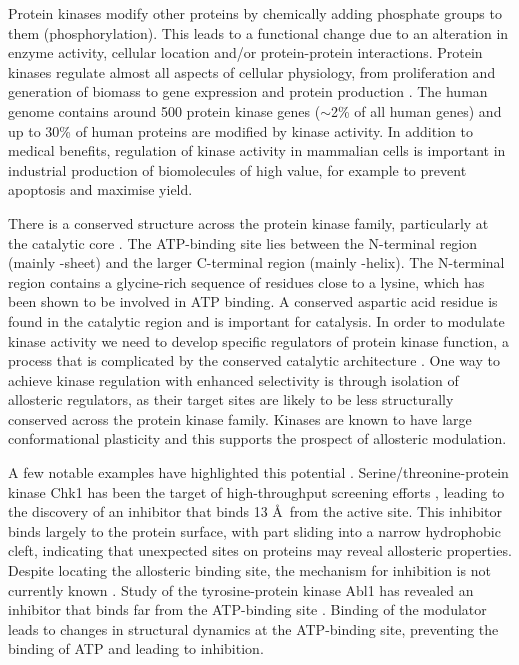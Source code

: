 Protein kinases modify other proteins by chemically adding phosphate groups to them (phosphorylation).
This leads to a functional change due to an alteration in enzyme activity, cellular location and/or protein-protein interactions.
Protein kinases regulate almost all aspects of cellular physiology, from proliferation and generation of biomass to gene expression and protein production \cite{Manning2002}.
The human genome contains around 500 protein kinase genes ($\sim$2\% of all human genes) and up to 30\% of human proteins are modified by kinase activity.
In addition to medical benefits, regulation of kinase activity in mammalian cells is important in industrial production of biomolecules of high value, for example to prevent apoptosis and maximise yield.

There is a conserved structure across the protein kinase family, particularly at the catalytic core \cite{Endicott2012}.
The ATP-binding site lies between the N-terminal region (mainly \textbeta -sheet) and the larger C-terminal region (mainly \textalpha -helix).
The N-terminal region contains a glycine-rich sequence of residues close to a lysine, which has been shown to be involved in ATP binding.
A conserved aspartic acid residue is found in the catalytic region and is important for catalysis.
In order to modulate kinase activity we need to develop specific regulators of protein kinase function, a process that is complicated by the conserved catalytic architecture \cite{Muller2015, Norman2012}.
One way to achieve kinase regulation with enhanced selectivity is through isolation of allosteric regulators, as their target sites are likely to be less structurally conserved across the protein kinase family.
Kinases are known to have large conformational plasticity \cite{Kornev2015, Huse2002} and this supports the prospect of allosteric modulation.

A few notable examples have highlighted this potential \cite{DeSmet2014, Gavrin2013}.
Serine/threonine-protein kinase Chk1 has been the target of high-throughput screening efforts \cite{Converso2009}, leading to the discovery of an inhibitor that binds 13 \AA\ from the active site.
This inhibitor binds largely to the protein surface, with part sliding into a narrow hydrophobic cleft, indicating that unexpected sites on proteins may reveal allosteric properties.
Despite locating the allosteric binding site, the mechanism for inhibition is not currently known \cite{Vanderpool2009}.
Study of the tyrosine-protein kinase Abl1 has revealed an inhibitor that binds far from the ATP-binding site \cite{Zhang2010, Yang2011}.
Binding of the modulator leads to changes in structural dynamics at the ATP-binding site, preventing the binding of ATP and leading to inhibition.

